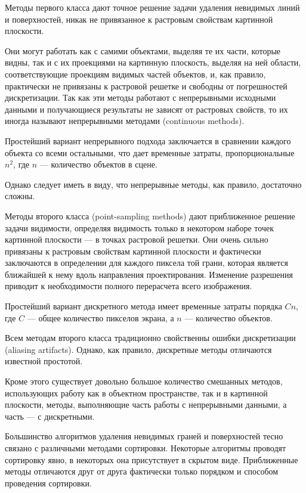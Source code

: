 Методы первого класса дают точное решение задачи удаления невидимых линий и поверхностей, никак не привязанное к растровым свойствам картинной плоскости.

Они могут работать как с самими объектами, выделяя те их части, которые видны, так и с их проекциями на картинную плоскость, выделяя на ней области, соответствующие проекциям видимых частей объектов, и, как правило, практически не привязаны к растровой решетке и свободны от погрешностей дискретизации. Так как эти методы работают с непрерывными исходными данными и получающиеся результаты не зависят от растровых свойств, то их иногда называют непрерывными методами (continuous methods).

Простейший вариант непрерывного подхода заключается в сравнении каждого объекта со всеми остальными, что дает временные затраты, пропорциональные \( n^2 \), где \( n \) — количество объектов в сцене.

Однако следует иметь в виду, что непрерывные методы, как правило, достаточно сложны.

Методы второго класса (point-sampling methods) дают приближенное решение задачи видимости, определяя видимость только в некотором наборе точек картинной плоскости — в точках растровой решетки. Они очень сильно привязаны к растровым свойствам картинной плоскости и фактически заключаются в определении для каждого пиксела той грани, которая является ближайшей к нему вдоль направления проектирования. Изменение разрешения приводит к необходимости полного перерасчета всего изображения.

Простейший вариант дискретного метода имеет временные затраты порядка \( Cn \), где \( C \) — общее количество пикселов экрана, а \( n \) — количество объектов.

Всем методам второго класса традиционно свойственны ошибки дискретизации (aliasing artifacts). Однако, как правило, дискретные методы отличаются известной простотой.

Кроме этого существует довольно большое количество смешанных методов, использующих работу как в объектном пространстве, так и в картинной плоскости, методы, выполняющие часть работы с непрерывными данными, а часть — с дискретными.

Большинство алгоритмов удаления невидимых граней и поверхностей тесно связано с различными методами сортировки. Некоторые алгоритмы проводят сортировку явно, в некоторых она присутствует в скрытом виде. Приближенные методы отличаются друг от друга фактически только порядком и способом проведения сортировки.

